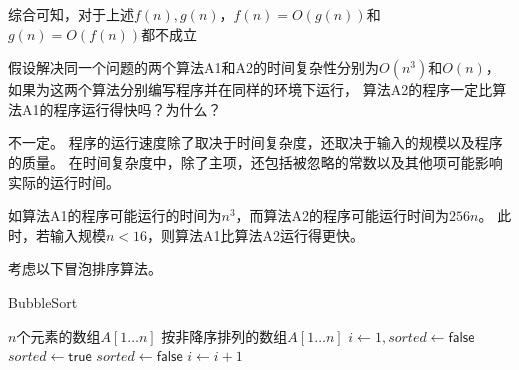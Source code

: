 \documentclass[answers]{exam}
\begin{document}
\begin{questions}
\begin{solution}
        综合可知，对于上述$f(n),g(n)$，$f(n)=O(g(n))$和$g(n)=O(f(n))$都不成立
    \end{solution}

    \newpage

    \question 假设解决同一个问题的两个算法A1和A2的时间复杂性分别为$O(n^3)$和$O(n)$，
    如果为这两个算法分别编写程序并在同样的环境下运行，
    算法A2的程序一定比算法A1的程序运行得快吗？为什么？

    \begin{solution}
        不一定。
        程序的运行速度除了取决于时间复杂度，还取决于输入的规模以及程序的质量。
        在时间复杂度中，除了主项，还包括被忽略的常数以及其他项可能影响实际的运行时间。

        如算法A1的程序可能运行的时间为$n^3$，而算法A2的程序可能运行时间为$256n$。
        此时，若输入规模$n < 16$，则算法A1比算法A2运行得更快。
    \end{solution}

    \newpage

    \question 考虑以下冒泡排序算法。
    \begin{algorithm}
        \caption{BubbleSort}
        \begin{algorithmic}[1]
            \Require $n$个元素的数组$A[1 \dots n]$
            \Ensure 按非降序排列的数组$A[1 \dots n]$
            \State $i \gets 1, sorted \gets \mathsf{false}$
            \State $sorted \gets \mathsf{true}$
            \State {}
            \State $sorted \gets \mathsf{false}$
            \EndIf
            \EndFor
            \State  $i \gets i+1$
            \EndWhile
        \end{algorithmic}
    \end{algorithm}
\end{questions}
\end{document}
